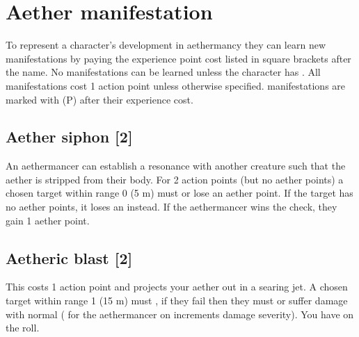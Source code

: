 \section{Aether manifestation}
\label{sec:spells}

To represent a character's development in aethermancy they can learn new manifestations by paying the experience point cost listed in square brackets after the name. No manifestations can be learned unless the character has . All manifestations cost 1 action point unless otherwise specified.  manifestations are marked with (P) after their experience cost.

%
\subsection{Aether siphon [2]}
An aethermancer can establish a resonance with another creature such that the aether is stripped from their body. For 2 action points (but no aether points) a chosen target within range 0 (5 m) must  or lose an aether point. If the target has no aether points, it loses an  instead. If the aethermancer wins the  check, they gain 1 aether point.


\subsection{Aetheric blast [2]}
\label{spell:sorc-blast}
This costs 1 action point and projects your aether out in a searing jet. A chosen target within range 1 (15 m) must , if they fail then they must  or suffer damage with normal  ( for the aethermancer on  increments damage severity). You have  on the  roll. 
